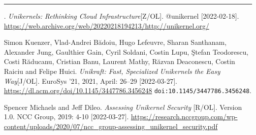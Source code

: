 \documentclass[UTF8,fontset=none,linespread=1.15]{ctexart}
\begin{document}
\begin{thebibliography}{99}
 \rule[0.5ex]{2em}{0.4pt}.
\textit{Unikernels: Rethinking Cloud Infrastructure}[Z/OL].
@unikernel [2022-02-18]. \url{https://web.archive.org/web/20220218194213/http://unikernel.org/}

 Simon Kuenzer, Vlad-Andrei Bădoiu, Hugo Lefeuvre, Sharan Santhanam,
Alexander Jung, Gaulthier Gain, Cyril Soldani, Costin Lupu, \c{S}tefan Teodorescu, Costi Răducanu,
Cristian Banu, Laurent Mathy, Răzvan Deaconescu, Costin Raiciu and Felipe Huici.
\textit{Unikraft: Fast, Specialized Unikernels the Easy Way}[J/OL]. EuroSys '21, 2021, April: 26–29
[2022-03-27]. \url{https://dl.acm.org/doi/10.1145/3447786.3456248} \texttt{doi:10.1145/3447786.3456248}.

 Spencer Michaels and Jeff Dileo. \textit{Assessing Unikernel Security
}[R/OL]. Version 1.0. NCC Group, 2019: 4-10 [2022-03-27].
\url{https://research.nccgroup.com/wp-content/uploads/2020/07/ncc_group-assessing_unikernel_security.pdf}


\end{thebibliography}
\end{document}
